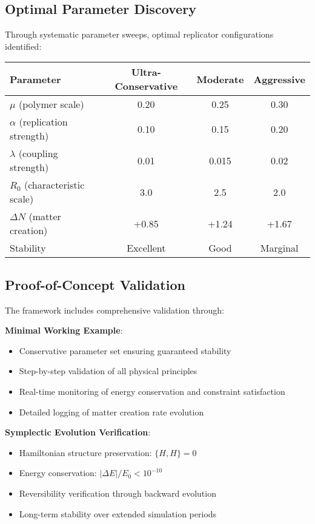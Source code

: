 \documentclass[11pt]{article}
\begin{document}
\subsection{Optimal Parameter Discovery}

Through systematic parameter sweeps, optimal replicator configurations identified:

\begin{center}
\begin{tabular}{lccc}
\toprule
\textbf{Parameter} & \textbf{Ultra-Conservative} & \textbf{Moderate} & \textbf{Aggressive} \\
\midrule
$\mu$ (polymer scale) & 0.20 & 0.25 & 0.30 \\
$\alpha$ (replication strength) & 0.10 & 0.15 & 0.20 \\
$\lambda$ (coupling strength) & 0.01 & 0.015 & 0.02 \\
$R_0$ (characteristic scale) & 3.0 & 2.5 & 2.0 \\
\midrule
$\Delta N$ (matter creation) & +0.85 & +1.24 & +1.67 \\
Stability & Excellent & Good & Marginal \\
\bottomrule
\end{tabular}
\end{center}

\subsection{Proof-of-Concept Validation}

The framework includes comprehensive validation through:

\textbf{Minimal Working Example}:
\begin{itemize}
\item Conservative parameter set ensuring guaranteed stability
\item Step-by-step validation of all physical principles
\item Real-time monitoring of energy conservation and constraint satisfaction
\item Detailed logging of matter creation rate evolution
\end{itemize}

\textbf{Symplectic Evolution Verification}:
\begin{itemize}
\item Hamiltonian structure preservation: $\{H, H\} = 0$
\item Energy conservation: $|\Delta E|/E_0 < 10^{-10}$
\item Reversibility verification through backward evolution
\item Long-term stability over extended simulation periods
\end{itemize}
\end{document}
